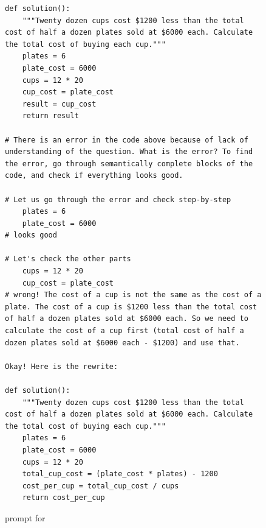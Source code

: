\begin{figure}
    \begin{verbatim}
def solution():
    """Twenty dozen cups cost $1200 less than the total cost of half a dozen plates sold at $6000 each. Calculate the total cost of buying each cup."""
    plates = 6
    plate_cost = 6000
    cups = 12 * 20
    cup_cost = plate_cost
    result = cup_cost
    return result

# There is an error in the code above because of lack of understanding of the question. What is the error? To find the error, go through semantically complete blocks of the code, and check if everything looks good.

# Let us go through the error and check step-by-step
    plates = 6
    plate_cost = 6000
# looks good

# Let's check the other parts
    cups = 12 * 20
    cup_cost = plate_cost
# wrong! The cost of a cup is not the same as the cost of a plate. The cost of a cup is $1200 less than the total cost of half a dozen plates sold at $6000 each. So we need to calculate the cost of a cup first (total cost of half a dozen plates sold at $6000 each - $1200) and use that.

Okay! Here is the rewrite:

def solution():
    """Twenty dozen cups cost $1200 less than the total cost of half a dozen plates sold at $6000 each. Calculate the total cost of buying each cup."""
    plates = 6
    plate_cost = 6000
    cups = 12 * 20
    total_cup_cost = (plate_cost * plates) - 1200
    cost_per_cup = total_cup_cost / cups
    return cost_per_cup
\end{verbatim}
\caption{\itermod prompt for \gsm}
\label{fig:prompt:gsm:refine}
\end{figure}


